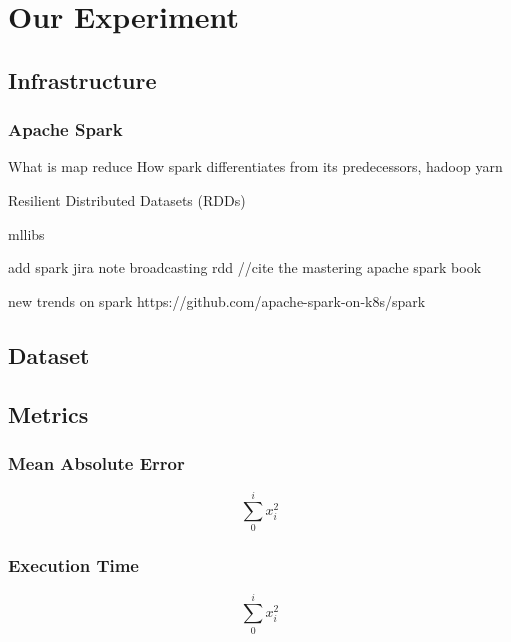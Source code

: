 \section{Our Experiment}
\subsection{Infrastructure}
\subsubsection{Apache Spark}
What is map reduce
How spark differentiates from its predecessors, hadoop yarn



Resilient Distributed Datasets (RDDs)

mllibs


add spark jira note
broadcasting rdd
//cite the mastering apache spark book

\cite{ApacheSpark:1}

new trends on spark https://github.com/apache-spark-on-k8s/spark

\subsection{Dataset}
\cite{MovieLens:3}
\subsection{Metrics}
\subsubsection{Mean Absolute Error}
\begin{equation}
\sum_{0}^{i}x_{i}^{2}
\end{equation}
\subsubsection{Execution Time}
\begin{equation}
\sum_{0}^{i}x_{i}^{2}
\end{equation}